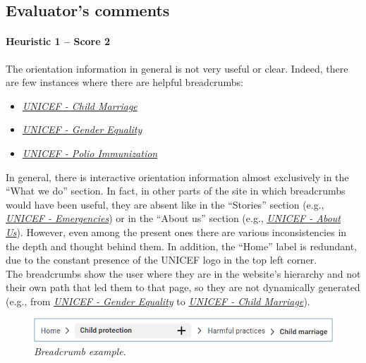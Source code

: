 \clearpage

\subsection*{Evaluator's comments}
\paragraph*{Heuristic 1 – Score 2}
The orientation information in general is not very useful or clear. Indeed, there are few instances where there are helpful breadcrumbs:
\begin{itemize}
	\item \textit{\href{https://www.unicef.org/protection/child-marriage}{UNICEF - Child Marriage}}
	\item \textit{\href{https://www.unicef.org/gender-equality}{UNICEF - Gender Equality}}
	\item \textit{\href{https://www.unicef.org/immunization/polio}{UNICEF - Polio Immunization}}
\end{itemize}

In general, there is interactive orientation information almost exclusively in the “What we do” section. In fact, in other parts of the site in which breadcrumbs would have been useful, they are absent like in the “Stories” section (e.g., \textit{\href{https://www.unicef.org/emergencies/13-emergencies-need-more-attention-support-2024}{UNICEF - Emergencies}}) or in the “About us” section (e.g., \textit{\href{https://www.unicef.org/about-us/75-years-unicef}{UNICEF - About Us}}).
However, even among the present ones there are various inconsistencies in the depth and thought behind them. In addition, the “Home” label is redundant, due to the constant presence of the UNICEF logo in the top left corner.\\
The breadcrumbs show the user where they are in the website’s hierarchy and not their own path that led them to that page, so they are not dynamically generated (e.g., from \textit{\href{https://www.unicef.org/gender-equality}{UNICEF - Gender Equality}} to \textit{\href{https://www.unicef.org/protection/child-marriage}{UNICEF - Child Marriage}}).

\begin{figure}[h]
	\includegraphics[width=\textwidth]{Picture1.png}
	\captionsetup{font=small}
	\caption{\textit{Breadcrumb example.}}
	\label{fig:label1}
\end{figure}

